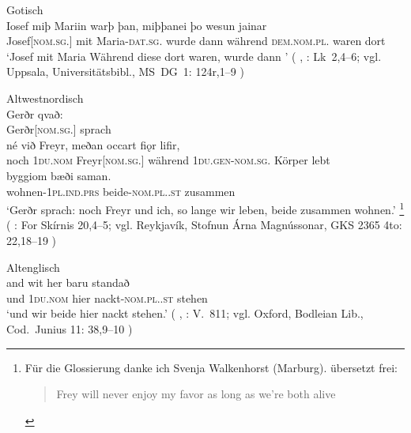 \begin{exe}
\ex \label{ex:germbeide}
	\begin{xlist}
	\ex \label{ex:germbeide_1}
		\langinfo%
			{Gotisch}
			{}
			{\cite[nach][]{projectwulfila2004}}
			\\
		\gll Iosef \textelp{} miþ Mariin \textelp{} warþ þan,
				miþþanei þo wesun jainar \textelp{} \\
			Josef[\textsc{nom.sg.\MascM}] {} mit Maria-\textsc{dat.sg.\FemF} {}
				wurde dann während \textsc{dem.nom.pl.\NeutMF} waren dort {} \\
		\trans `Josef \textelp{} mit Maria \textelp{} Während diese dort
			waren, wurde dann \textelp{}'
			(%
				, : Lk~2,4--6;
				vgl. Uppsala, Universitätsbibl., MS~DG~1: 124r,1--9%
			)

	\ex \label{ex:germbeide_2}
		\langinfo%
			{Altwestnordisch}
			{}
			{\cite[nach][73]{neckelkuhn1962}}\\
		\gll Gerðr qvað: \textelp{} \\
			Gerðr[\textsc{nom.sg.\FemF}] sprach {} \\
		\gll né við Freyr, meðan occart fiǫr lifir, \\
			noch \textsc{1du\subMF.nom} Freyr[\textsc{nom.sg.\MascM}] während
				\textsc{1du.gen-nom.sg.\NeutMF} Körper lebt \\
		\gll byggiom bæði saman. \\
			wohnen-\textsc{1pl.ind.prs} beide-\textsc{nom.pl.\NeutMF.st} zusammen \\
		\trans `Gerðr sprach: \textelp{} noch Freyr und ich, so
			lange wir leben, beide zusammen wohnen.'%
			\footnote{Für die Glossierung danke ich Svenja Walkenhorst
				(Marburg). \citeauthor[53]{terry1990} übersetzt frei:
				\foreignblockquote{english}{Frey will never
				enjoy my favor as long as we're both alive}.}
			(%
				: For Skírnis 20,4--5;
				vgl. Reykjavík, Stofnun Árna Magnússonar, GKS 2365 4to: 22,18--19%
			)

	\ex \label{ex:germbeide_3}
		\langinfo%
			{Altenglisch}
			{}
			{\cite[nach][27]{krapp1931}}\\
		\gll and wit her baru standað \\
			und \textsc{1du\subMF.nom} hier nackt-\textsc{nom.pl.\NeutMF.st}
				stehen \\
		\trans `und wir beide 
			hier nackt stehen.'
			(%
				, : V.~811;
				vgl. Oxford, Bodleian Lib., Cod.~Junius 11: 38,9--10%
			)			


\end{xlist}
\end{exe}
